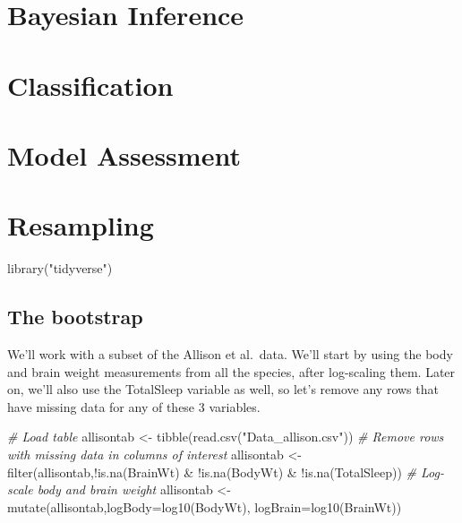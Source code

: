 \documentclass[
]{book}
\newenvironment{Shaded}{\begin{snugshade}}{\end{snugshade}}
\newcommand{\AttributeTok}[1]{\textcolor[rgb]{0.77,0.63,0.00}{#1}}
\newcommand{\CommentTok}[1]{\textcolor[rgb]{0.56,0.35,0.01}{\textit{#1}}}
\newcommand{\FunctionTok}[1]{\textcolor[rgb]{0.00,0.00,0.00}{#1}}
\newcommand{\NormalTok}[1]{#1}
\newcommand{\OtherTok}[1]{\textcolor[rgb]{0.56,0.35,0.01}{#1}}
\newcommand{\SpecialCharTok}[1]{\textcolor[rgb]{0.00,0.00,0.00}{#1}}
\newcommand{\StringTok}[1]{\textcolor[rgb]{0.31,0.60,0.02}{#1}}
\begin{document}
\hypertarget{bayesian-inference}{%
\chapter{Bayesian Inference}\label{bayesian-inference}}

\hypertarget{classification}{%
\chapter{Classification}\label{classification}}

\hypertarget{model-assessment}{%
\chapter{Model Assessment}\label{model-assessment}}

\hypertarget{resampling}{%
\chapter{Resampling}\label{resampling}}

\begin{Shaded}
\begin{Highlighting}[]
\FunctionTok{library}\NormalTok{(}\StringTok{"tidyverse"}\NormalTok{)}
\end{Highlighting}
\end{Shaded}

\hypertarget{the-bootstrap}{%
\section{The bootstrap}\label{the-bootstrap}}

We'll work with a subset of the Allison et al.~data. We'll start by using the body and brain weight measurements from all the species, after log-scaling them. Later on, we'll also use the TotalSleep variable as well, so let's remove any rows that have missing data for any of these 3 variables.

\begin{Shaded}
\begin{Highlighting}[]
\CommentTok{\# Load table}
\NormalTok{allisontab }\OtherTok{\textless{}{-}} \FunctionTok{tibble}\NormalTok{(}\FunctionTok{read.csv}\NormalTok{(}\StringTok{"Data\_allison.csv"}\NormalTok{))}
\CommentTok{\# Remove rows with missing data in columns of interest }
\NormalTok{allisontab }\OtherTok{\textless{}{-}} \FunctionTok{filter}\NormalTok{(allisontab,}\SpecialCharTok{!}\FunctionTok{is.na}\NormalTok{(BrainWt) }\SpecialCharTok{\&} \SpecialCharTok{!}\FunctionTok{is.na}\NormalTok{(BodyWt) }\SpecialCharTok{\&} \SpecialCharTok{!}\FunctionTok{is.na}\NormalTok{(TotalSleep))}
\CommentTok{\# Log{-}scale body and brain weight}
\NormalTok{allisontab }\OtherTok{\textless{}{-}} \FunctionTok{mutate}\NormalTok{(allisontab,}\AttributeTok{logBody=}\FunctionTok{log10}\NormalTok{(BodyWt), }\AttributeTok{logBrain=}\FunctionTok{log10}\NormalTok{(BrainWt))}
\end{Highlighting}
\end{Shaded}
\end{document}
